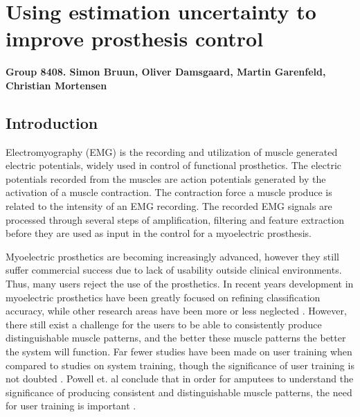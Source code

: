 
\chapter*{Using estimation uncertainty to improve prosthesis control}

\textbf{Group 8408. Simon Bruun, Oliver Damsgaard, Martin Garenfeld, Christian Mortensen}

\section{Introduction}

Electromyography (EMG) is the recording and utilization of muscle generated electric potentials, widely used in control of functional prosthetics. The electric potentials recorded from the muscles are action potentials generated by the activation of a muscle contraction. The contraction force a muscle produce is related to the intensity of an EMG recording. The recorded EMG signals are processed through several steps of amplification, filtering and feature extraction before they are used as input in the control for a myoelectric prosthesis. \cite{Cram2012, Fougner2012}

Myoelectric prosthetics are becoming increasingly advanced, however they still suffer commercial success due to lack of usability outside clinical environments. \cite{Hwang2017, Jiang2012, Scheme2010} Thus, many users reject the use of the prosthetics. 
In recent years development in myoelectric prosthetics have been greatly focused on refining classification accuracy, while other research areas have been more or less neglected \cite{Jiang2012}. However, there still exist a challenge for the users to be able to consistently produce distinguishable muscle patterns, and the better these muscle patterns the better the system will function. \cite{Powell2014} Far fewer studies have been made on user training when compared to studies on system training, though the significance of user training is not doubted \cite{Fang2017}. Powell et. al conclude that in order for amputees to understand the significance of producing consistent and distinguishable muscle patterns, the need for user training is important \cite{Powell2013}.


